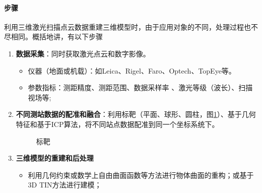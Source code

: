 \paragraph{步骤}利用三维激光扫描点云数据重建三维模型时，由于应用对象的不同，处理过程也不尽相同。概括地讲，有以下步骤
\begin{enumerate}
	\item \textbf{数据采集}：同时获取激光点云和数字影像。
		\begin{itemize}
			\item 仪器（地面或机载）：如Leica、Rigel、Faro、Optech、TopEye等。
			\item 参数指标：测距精度、测距范围、数据采样率 、激光等级（波长）、扫描视场等;
		\end{itemize}
	\item \textbf{不同测站数据的配准和融合}：利用标靶（平面、球形、圆柱，图\ref{fig:标靶}）、基于几何特征和基于ICP算法，将不同站点数据配准到同一个坐标系统下。
		\begin{figure}[htbp]
			\centering
			\hspace{3em}
			 \hspace{3em}
			\caption{标靶}
			\label{fig:标靶}
			\hspace{3em}
		\end{figure}
	\item \textbf{三维模型的重建和后处理}
		\begin{itemize}
			\item 利用几何约束或数学上自由曲面函数等方法进行物体曲面的重构；或基于3D TIN方法进行建模；

\end{itemize}
\end{enumerate}
